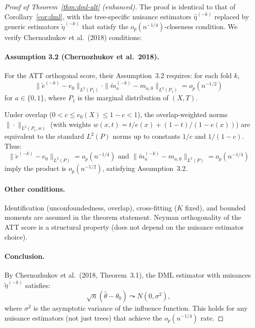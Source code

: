 \begin{proof}[Proof of Theorem~\ref{thm:dml-alt} (enhanced)]
The proof is identical to that of Corollary~\ref{cor:dml}, with the tree-specific nuisance estimators $\hat\eta^{(-k)}$ replaced by generic estimators $\tilde{\eta}^{(-k)}$ that satisfy the $o_p(n^{-1/4})$-closeness condition. We verify Chernozhukov et al.\ (2018) conditions:

\paragraph{Assumption 3.2 (Chernozhukov et al.\ 2018).}
For the ATT orthogonal score, their Assumption~3.2 requires: for each fold $k$,
\[
\|\tilde{e}^{(-k)} - e_0\|_{L^2(P_1)} \cdot \|\tilde{m}_a^{(-k)} - m_{a,0}\|_{L^2(P_1)} = o_p(n^{-1/2})
\]
for $a \in \{0, 1\}$, where $P_1$ is the marginal distribution of $(X, T)$.

Under overlap ($0 < c \le e_0(X) \le 1-c < 1$), the overlap-weighted norms $\|\cdot\|_{L^2(P_1, w)}$ (with weights $w(x,t) = t/e(x) + (1-t)/(1-e(x))$) are equivalent to the standard $L^2(P)$ norms up to constants $1/c$ and $1/(1-c)$. Thus:
\[
\|\tilde{e}^{(-k)} - e_0\|_{L^2(P)} = o_p(n^{-1/4}) \text{ and } \|\tilde{m}_a^{(-k)} - m_{a,0}\|_{L^2(P)} = o_p(n^{-1/4})
\]
imply the product is $o_p(n^{-1/2})$, satisfying Assumption~3.2.

\paragraph{Other conditions.}
Identification (unconfoundedness, overlap), cross-fitting ($K$ fixed), and bounded moments are assumed in the theorem statement. Neyman orthogonality of the ATT score is a structural property (does not depend on the nuisance estimator choice).

\paragraph{Conclusion.}
By Chernozhukov et al.\ (2018, Theorem~3.1), the DML estimator with nuisances $\tilde{\eta}^{(-k)}$ satisfies:
\[
\sqrt{n}(\hat\theta - \theta_0) \leadsto N(0, \sigma^2),
\]
where $\sigma^2$ is the asymptotic variance of the influence function. This holds for any nuisance estimators (not just trees) that achieve the $o_p(n^{-1/4})$ rate.
\end{proof}



